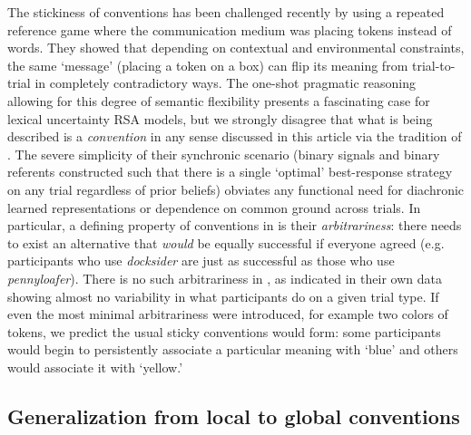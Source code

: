 \documentclass[11pt, floatsintext, jou]{apa6}
\begin{document}
The stickiness of conventions has been challenged recently by  using a repeated reference game where the communication medium was placing tokens instead of words. They showed that depending on contextual and environmental constraints, the same `message' (placing a token on a box) can flip its meaning from trial-to-trial in completely contradictory ways. The one-shot pragmatic reasoning allowing for this degree of semantic flexibility presents a fascinating case for lexical uncertainty RSA models, but we strongly disagree that what is being described is a \emph{convention} in any sense discussed in this article via the tradition of . The severe simplicity of their synchronic scenario (binary signals and binary referents constructed such that there is a single `optimal' best-response strategy on any trial regardless of prior beliefs) obviates any functional need for diachronic learned representations or dependence on common ground across trials. In particular, a defining property of conventions in is their \emph{arbitrariness}: there needs to exist an alternative that \emph{would} be equally successful if everyone agreed (e.g. participants who use \emph{docksider} are just as successful as those who use  \emph{pennyloafer}). There is no such arbitrariness in , as indicated in their own data showing almost no variability in what participants do on a given trial type. If even the most minimal arbitrariness were introduced, for example two colors of tokens, we predict the usual sticky conventions would form: some participants would begin to persistently associate a particular meaning with `blue' and others would associate it with `yellow.' %

%
%

\subsection{Generalization from local to global conventions}
\end{document}
